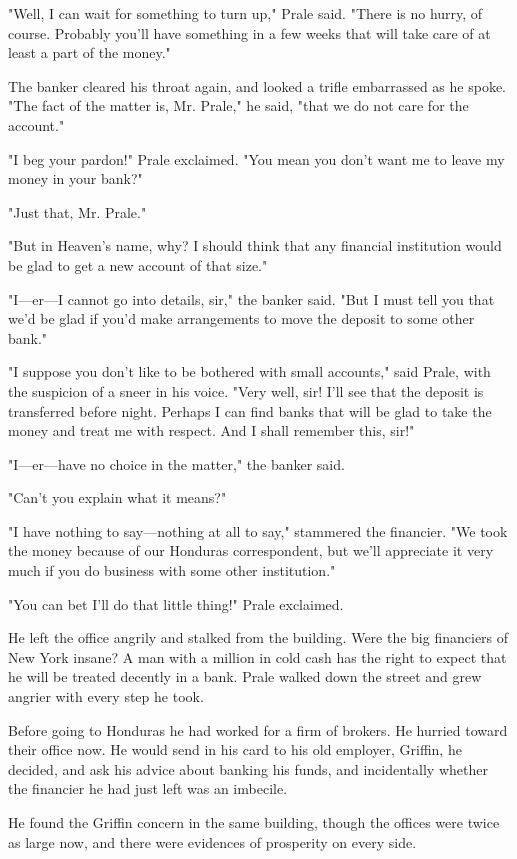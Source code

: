\documentclass{novel}
\begin{document}
"Well, I can wait for something to turn up," Prale said. "There is no hurry, of course. Probably you'll have something in a few weeks that will take care of at least a part of the money."

The banker cleared his throat again, and looked a trifle embarrassed as he spoke. "The fact of the matter is, Mr. Prale," he said, "that we do not care for the account."

"I beg your pardon!" Prale exclaimed. "You mean you don't want me to leave my money in your bank?"

"Just that, Mr. Prale."

"But in Heaven's name, why? I should think that any financial institution would be glad to get a new account of that size."

"I---er---I cannot go into details, sir," the banker said. "But I must tell you that we'd be glad if you'd make arrangements to move the deposit to some other bank."

"I suppose you don't like to be bothered with small accounts," said Prale, with the suspicion of a sneer in his voice. "Very well, sir! I'll see that the deposit is transferred before night. Perhaps I can find banks that will be glad to take the money and treat me with respect. And I shall remember this, sir!"

"I---er---have no choice in the matter," the banker said.

"Can't you explain what it means?"

"I have nothing to say---nothing at all to say," stammered the financier. "We took the money because of our Honduras correspondent, but we'll appreciate it very much if you do business with some other institution."

"You can bet I'll do that little thing!" Prale exclaimed.

He left the office angrily and stalked from the building. Were the big financiers of New York insane? A man with a million in cold cash has the right to expect that he will be treated decently in a bank. Prale walked down the street and grew angrier with every step he took.

Before going to Honduras he had worked for a firm of brokers. He hurried toward their office now. He would send in his card to his old employer, Griffin, he decided, and ask his advice about banking his funds, and incidentally whether the financier he had just left was an imbecile.

He found the Griffin concern in the same building, though the offices were twice as large now, and there were evidences of prosperity on every side.
\end{document}
